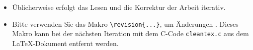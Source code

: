 \documentclass[../template_diplom.tex]{subfiles}
\begin{document}
\begin{itemize}

  \item Üblicherweise erfolgt das Lesen und die Korrektur der Arbeit iterativ.
  \item Bitte verwenden Sie das Makro \verb$\revision{...}$, um Änderungen . Dieses Makro kann bei der nächsten Iteration mit dem C-Code \verb$cleantex.c$ aus dem \LaTeX-Dokument entfernt werden.

\end{itemize}

\ifSubfilesClassLoaded{
  \printbibliography
}{}
\end{document}
